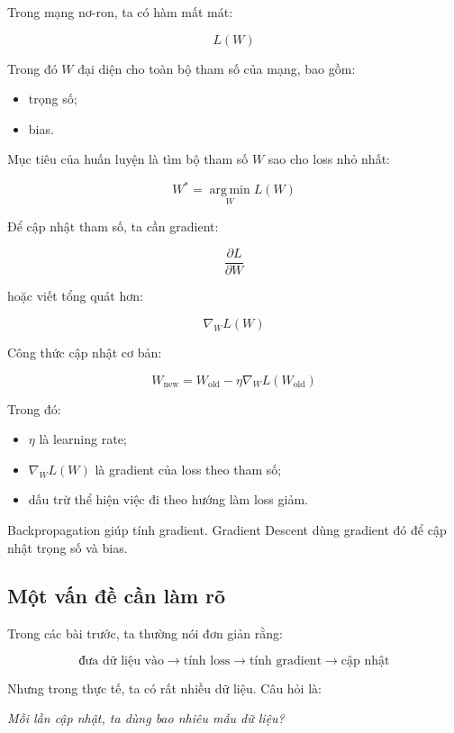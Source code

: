Trong mạng nơ-ron, ta có hàm mất mát:

\[
    L(W)
\]

Trong đó $W$ đại diện cho toàn bộ tham số của mạng, bao gồm:

\begin{itemize}
    \item trọng số;
    \item bias.
\end{itemize}

Mục tiêu của huấn luyện là tìm bộ tham số $W$ sao cho loss nhỏ nhất:

\[
    W^*=\operatorname*{arg\,min}_{W}L(W)
\]

Để cập nhật tham số, ta cần gradient:

\[
    \frac{\partial L}{\partial W}
\]

hoặc viết tổng quát hơn:

\[
    \nabla_W L(W)
\]

Công thức cập nhật cơ bản:

\[
    W_{\text{new}}
    =
    W_{\text{old}}
    -
    \eta \nabla_W L(W_{\text{old}})
\]

Trong đó:

\begin{itemize}
    \item $\eta$ là learning rate;
    \item $\nabla_W L(W)$ là gradient của loss theo tham số;
    \item dấu trừ thể hiện việc đi theo hướng làm loss giảm.
\end{itemize}

\begin{ghinho}
Backpropagation giúp tính gradient. Gradient Descent dùng gradient đó để cập nhật trọng số và bias.
\end{ghinho}

\subsection{Một vấn đề cần làm rõ}

Trong các bài trước, ta thường nói đơn giản rằng:

\[
    \text{đưa dữ liệu vào}
    \rightarrow
    \text{tính loss}
    \rightarrow
    \text{tính gradient}
    \rightarrow
    \text{cập nhật}
\]

Nhưng trong thực tế, ta có rất nhiều dữ liệu. Câu hỏi là:

\begin{center}
\textit{Mỗi lần cập nhật, ta dùng bao nhiêu mẫu dữ liệu?}
\end{center}

